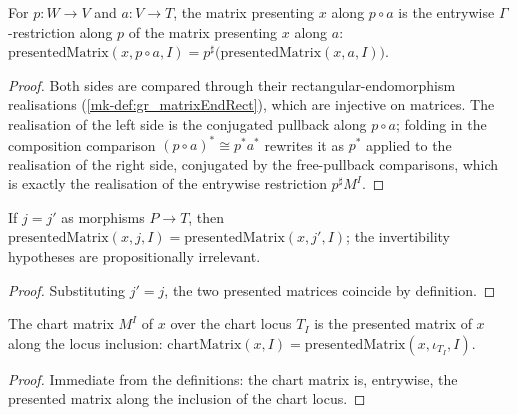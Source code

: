 \begin{lemma}\label{mk-lem:gr_presentedMatrix_comp}
  \leanok

  For \(p : W \to V\) and \(a : V \to T\), the matrix presenting \(x\) along \(p\circ a\) is
  the entrywise \(\Gamma\)-restriction along \(p\) of the matrix presenting \(x\) along \(a\):
  \(\mathrm{presentedMatrix}(x, p\circ a, I) = p^{\sharp}\bigl(\mathrm{presentedMatrix}(x,
  a, I)\bigr)\).
\end{lemma}
\begin{proof}
  Both sides are compared through their rectangular-endomorphism realisations
  (\ref{mk-def:gr_matrixEndRect}), which are injective on matrices. The realisation of the left
  side is the conjugated pullback along \(p\circ a\); folding in the composition comparison
  \((p\circ a)^{*}\cong p^{*}a^{*}\) rewrites it as \(p^{*}\) applied to the realisation of the
  right side, conjugated by the free-pullback comparisons, which is exactly the realisation of
  the entrywise restriction \(p^{\sharp}M^I\).
\end{proof}

\begin{lemma}\label{mk-lem:gr_presentedMatrix_congr}
  \leanok

  If \(j = j'\) as morphisms \(P \to T\), then \(\mathrm{presentedMatrix}(x, j, I) =
  \mathrm{presentedMatrix}(x, j', I)\); the invertibility hypotheses are propositionally
  irrelevant.
\end{lemma}
\begin{proof}
  Substituting \(j' = j\), the two presented matrices coincide by definition.
\end{proof}

\begin{lemma}\label{mk-lem:gr_chartMatrix_eq_presentedMatrix}
  \leanok

  The chart matrix \(M^I\) of \(x\) over the chart locus \(T_I\) is the presented matrix of
  \(x\) along the locus inclusion: \(\mathrm{chartMatrix}(x, I) =
  \mathrm{presentedMatrix}(x, \iota_{T_I}, I)\).
\end{lemma}
\begin{proof}
  Immediate from the definitions: the chart matrix is, entrywise, the presented matrix along
  the inclusion of the chart locus.
\end{proof}


